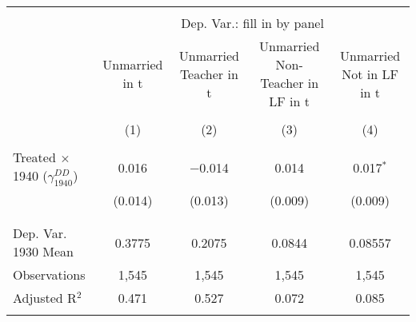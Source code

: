 
\begin{tabular}{@{\extracolsep{5pt}}lcccc} 
\\[-1.8ex]\hline 
\hline \\[-1.8ex] 
 & \multicolumn{4}{c}{Dep. Var.: fill in by panel} \\ 
\cline{2-5} 
 & Unmarried in t & Unmarried Teacher in t & Unmarried Non-Teacher in LF in t & Unmarried Not in LF in t \\ 
\\[-1.8ex] & (1) & (2) & (3) & (4)\\ 
\hline \\[-1.8ex] 
 Treated $\times$ 1940 ($\gamma_{1940}^{DD}$) & 0.016 & $-$0.014 & 0.014 & 0.017$^{*}$ \\ 
  & (0.014) & (0.013) & (0.009) & (0.009) \\ 
  & & & & \\ 
\hline \\[-1.8ex] 
Dep. Var. 1930 Mean & 0.3775 & 0.2075 & 0.0844 & 0.08557 \\ 
Observations & 1,545 & 1,545 & 1,545 & 1,545 \\ 
Adjusted R$^{2}$ & 0.471 & 0.527 & 0.072 & 0.085 \\ 
\hline 
\hline \\[-1.8ex] 
\end{tabular} 
